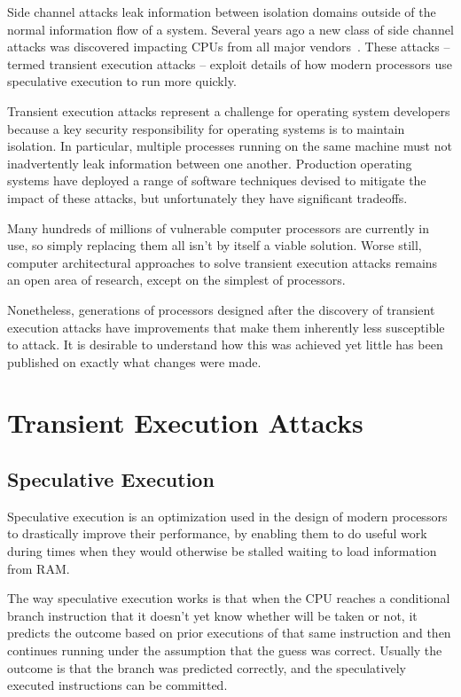 \noindent
Side channel attacks leak information between isolation domains outside of the normal information flow of a system.
Several years ago a new class of side channel attacks was discovered impacting CPUs from all major vendors~\cite{lipp:meltdown, kocher:spectre}.
These attacks -- termed transient execution attacks -- exploit details of how modern processors use speculative execution to run more quickly. 

Transient execution attacks represent a challenge for operating system developers because a key security responsibility for operating systems is to maintain isolation.
In particular, multiple processes running on the same machine must not inadvertently leak information between one another.
Production operating systems have deployed a range of software techniques devised to mitigate the impact of these attacks, but unfortunately they have significant tradeoffs.

Many hundreds of millions of vulnerable computer processors are currently in use, so simply replacing them all isn’t by itself a viable solution.
Worse still, computer architectural approaches to solve transient execution attacks remains an open area of research, except on the simplest of processors.

Nonetheless, generations of processors designed after the discovery of transient execution attacks have improvements that make them inherently less susceptible to attack.
It is desirable to understand how this was achieved yet little has been published on exactly what changes were made.

\section*{Transient Execution Attacks}
\subsection*{Speculative Execution}
Speculative execution is an optimization used in the design of modern processors to drastically improve their performance, by enabling them to do useful work during times when they would otherwise be stalled waiting to load information from RAM.

The way speculative execution works is that when the CPU reaches a conditional branch instruction that it doesn't yet know whether will be taken or not, it predicts the outcome based on prior executions of that same instruction and then continues running under the assumption that the guess was correct.
Usually the outcome is that the branch was predicted correctly, and the speculatively executed instructions can be committed.

